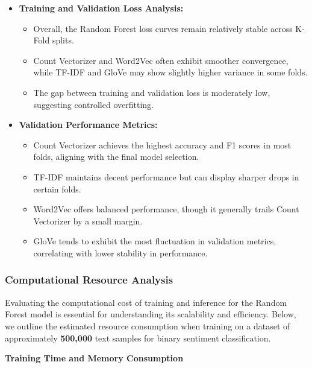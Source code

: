 \begin{itemize}
    \item \textbf{Training and Validation Loss Analysis:}
    \begin{itemize}
        \item Overall, the Random Forest loss curves remain relatively stable across K-Fold splits.
        \item Count Vectorizer and Word2Vec often exhibit smoother convergence, while TF-IDF and GloVe may show slightly higher variance in some folds.
        \item The gap between training and validation loss is moderately low, suggesting controlled overfitting.
    \end{itemize}
    
    \item \textbf{Validation Performance Metrics:}
    \begin{itemize}
        \item Count Vectorizer achieves the highest accuracy and F1 scores in most folds, aligning with the final model selection.
        \item TF-IDF maintains decent performance but can display sharper drops in certain folds.
        \item Word2Vec offers balanced performance, though it generally trails Count Vectorizer by a small margin.
        \item GloVe tends to exhibit the most fluctuation in validation metrics, correlating with lower stability in performance.
    \end{itemize}
\end{itemize}

\subsubsection{Computational Resource Analysis}

Evaluating the computational cost of training and inference for the Random Forest model is essential for understanding its scalability and efficiency. Below, we outline the estimated resource consumption when training on a dataset of approximately \textbf{500,000} text samples for binary sentiment classification.

\textbf{Training Time and Memory Consumption}

